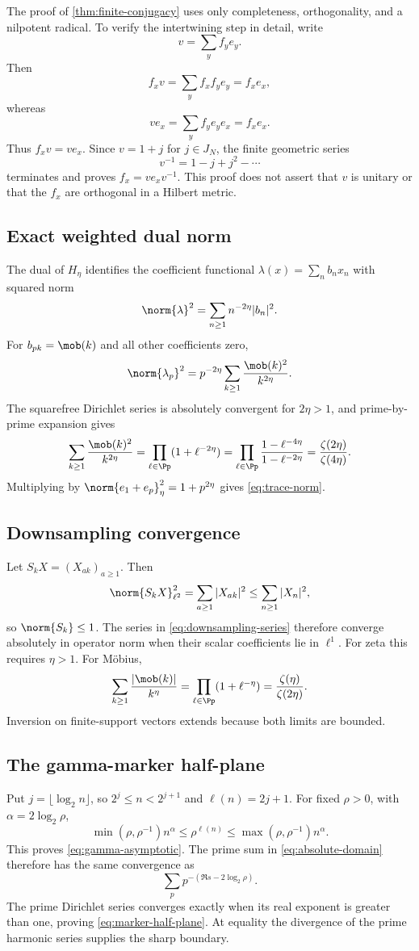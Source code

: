 The proof of \cref{thm:finite-conjugacy} uses only completeness,
orthogonality, and a nilpotent radical. To verify the intertwining step in
detail, write
\[
v=\sum_y f_ye_y.
\]
Then
\[
f_xv
=\sum_y f_xf_ye_y
=f_xe_x,
\]
whereas
\[
ve_x
=\sum_y f_ye_ye_x
=f_xe_x.
\]
Thus \(f_xv=ve_x\). Since \(v=1+j\) for \(j\in J_N\), the finite geometric
series
\[
v^{-1}=1-j+j^2-\cdots
\]
terminates and proves \(f_x=ve_xv^{-1}\). This proof does not assert that
\(v\) is unitary or that the \(f_x\) are orthogonal in a Hilbert metric.

\subsection{Exact weighted dual norm}

The dual of \(H_\eta\) identifies the coefficient functional
\(\lambda(x)=\sum_n b_nx_n\) with squared norm
\[
\norm{\lambda}^2=\sum_{n\ge1}n^{-2\eta}|b_n|^2.
\]
For \(b_{pk}=\mob(k)\) and all other coefficients zero,
\[
\norm{\lambda_p}^2
=p^{-2\eta}\sum_{k\ge1}\frac{\mob(k)^2}{k^{2\eta}}.
\]
The squarefree Dirichlet series is absolutely convergent for
\(2\eta>1\), and prime-by-prime expansion gives
\[
\sum_{k\ge1}\frac{\mob(k)^2}{k^{2\eta}}
=\prod_{\ell\in\Pp}(1+\ell^{-2\eta})
=\prod_{\ell\in\Pp}
  \frac{1-\ell^{-4\eta}}{1-\ell^{-2\eta}}
=\frac{\zeta(2\eta)}{\zeta(4\eta)}.
\]
Multiplying by \(\norm{e_1+e_p}_\eta^2=1+p^{2\eta}\) gives
\eqref{eq:trace-norm}.

\subsection{Downsampling convergence}

Let \(S_kX=(X_{ak})_{a\ge1}\). Then
\[
\norm{S_kX}_{\ell^2}^2
=\sum_{a\ge1}|X_{ak}|^2
\le\sum_{n\ge1}|X_n|^2,
\]
so \(\norm{S_k}\le1\). The series in
\eqref{eq:downsampling-series} therefore converge absolutely in operator norm
when their scalar coefficients lie in \(\ell^1\). For zeta this requires
\(\eta>1\). For Möbius,
\[
\sum_{k\ge1}\frac{|\mob(k)|}{k^\eta}
=\prod_{\ell\in\Pp}(1+\ell^{-\eta})
=\frac{\zeta(\eta)}{\zeta(2\eta)}.
\]
Inversion on finite-support vectors extends because both limits are bounded.

\subsection{The gamma-marker half-plane}

Put \(j=\lfloor\log_2n\rfloor\), so \(2^j\le n<2^{j+1}\) and
\(\ell(n)=2j+1\). For fixed \(\rho>0\), with
\(\alpha=2\log_2\rho\),
\[
\min(\rho,\rho^{-1})n^\alpha
\le \rho^{\ell(n)}
\le \max(\rho,\rho^{-1})n^\alpha.
\]
This proves \eqref{eq:gamma-asymptotic}. The prime sum in
\eqref{eq:absolute-domain} therefore has the same convergence as
\[
\sum_p p^{-(\Re s-2\log_2\rho)}.
\]
The prime Dirichlet series converges exactly when its real exponent is greater
than one, proving \eqref{eq:marker-half-plane}. At equality the divergence of
the prime harmonic series supplies the sharp boundary.

